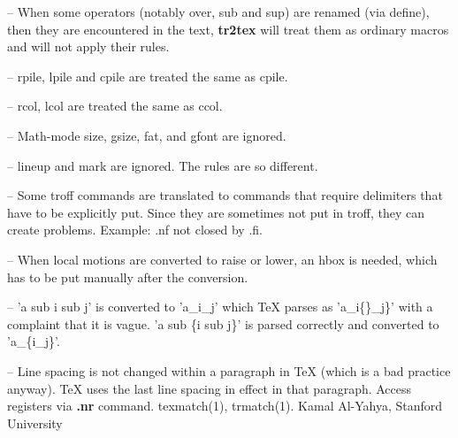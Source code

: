 -- When some operators (notably over, sub and sup) are renamed (via define),
then they are encountered in the text,
{\bf tr2tex}
will treat them as
ordinary macros and will not apply their rules.
\par
-- rpile, lpile and cpile are treated the same as cpile.
\par
-- rcol, lcol are treated the same as ccol.
\par
-- Math-mode size, gsize, fat, and gfont are ignored.
\par
-- lineup and mark are ignored. The rules are so different.
\par
-- Some troff commands are translated to commands that require
delimiters that have to be explicitly put. Since they are
sometimes not put in troff, they can create problems.
Example: .nf not closed by .fi.
\par
-- When local motions are converted to \bs raise or \bs lower, an \bs hbox
is needed, which has to be put manually after the conversion.
\par
-- 'a sub i sub j' is converted to 'a\_i\_j' which TeX
parses as 'a\_i\{\}\_j\}' with a complaint that it is vague. 'a sub \{i sub j\}'
is parsed correctly and converted to 'a\_\{i\_j\}'.
\par
-- Line spacing is not changed within a paragraph in TeX
(which is a bad practice anyway).
TeX uses the last line spacing in effect in that paragraph.
Access registers via
{\bf .nr}
command.
texmatch(1), trmatch(1).
Kamal Al-Yahya, Stanford University

